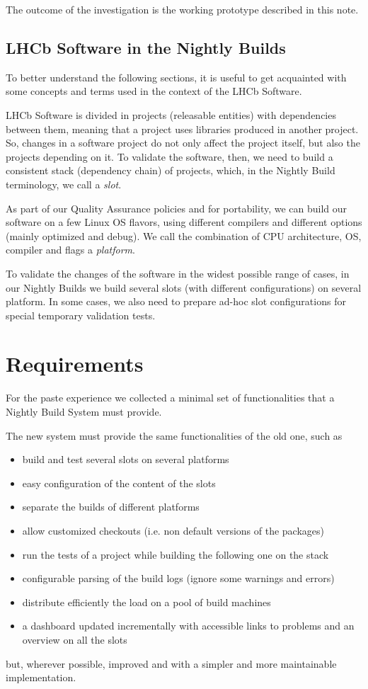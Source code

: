 \documentclass{lhcbnote}
\begin{document}
The outcome of the investigation is the working prototype described in this
note.

\subsection{LHCb Software in the Nightly Builds}
To better understand the following sections, it is useful to get acquainted with
some concepts and terms used in the context of the LHCb Software.

LHCb Software is divided in projects (releasable entities) with dependencies
between them, meaning that a project uses libraries produced in another project.
So, changes in a software project do not only affect the project itself, but
also the projects depending on it.  To validate the software, then, we need to
build a consistent stack (dependency chain) of projects, which, in the Nightly
Build terminology, we call a \emph{slot}.

As part of our Quality Assurance policies and for portability, we can build our
software on a few Linux OS flavors, using different compilers and different
options (mainly optimized and debug).  We call the combination of CPU
architecture, OS, compiler and flags a \emph{platform}.

To validate the changes of the software in the widest possible range of cases,
in our Nightly Builds we build several slots (with different configurations) on
several platform.  In some cases, we also need to prepare ad-hoc slot
configurations for special temporary validation tests.

\section{Requirements}
For the paste experience we collected a minimal set of functionalities that a
Nightly Build System must provide.

The new system must provide the same functionalities of the old one, such as
\begin{itemize}
  \item build and test several slots on several platforms
  \item easy configuration of the content of the slots
  \item separate the builds of different platforms
  \item allow customized checkouts (i.e. non default versions of the packages)
  \item run the tests of a project while building the following one on the stack
  \item configurable parsing of the build logs (ignore some warnings and errors)
  \item distribute efficiently the load on a pool of build machines
  \item a dashboard updated incrementally with accessible links to problems and
an overview on all the slots
\end{itemize}
but, wherever possible, improved and with a simpler and more maintainable
implementation.
\end{document}
